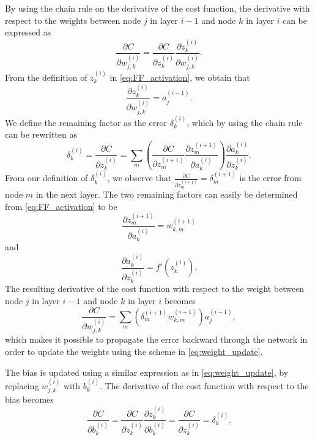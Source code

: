 \documentclass[12pt]{article}
\begin{document}
By using the chain rule on the derivative of the cost function, the derivative with respect to the weights between node $j$ in layer $i-1$ and node $k$ in layer $i$ can be expressed as
\begin{equation}
    \frac{\partial C}{\partial w^{(i)}_{j,k}} = \frac{\partial C}{\partial z^{(i)}_k} \frac{\partial z^{(i)}_k}{\partial w^{(i)}_{j, k}}.
\end{equation}
From the definition of $z^{(i)}_k$ in \autoref{eq:FF_activation}, we obtain that
\begin{equation}
    \frac{\partial z^{(i)}_k}{\partial w^{(i)}_{j, k}} = a^{(i-1)}_j.
\end{equation}
We define the remaining factor as the error $\delta_k^{(i)}$, which by using the chain rule can be rewritten as
\begin{equation}
    \delta_k^{(i)} = \frac{\partial C}{\partial z^{(i)}_k} = \sum_m \left( \frac{\partial C}{\partial z^{(i+1)}_m} \frac{\partial z^{(i+1)}_m}{\partial a^{(i)}_k} \right) \frac{\partial a^{(i)}_k}{\partial z^{(i)}_k}.
\end{equation}
From our definition of $\delta_k^{(i)}$, we observe that $\frac{\partial C}{\partial z_m^{(i+1)}} = \delta_m^{(i+1)}$ is the error from node $m$ in the next layer. The two remaining factors can easily be determined from \autoref{eq:FF_activation} to be
\begin{equation}
    \frac{\partial z^{(i+1)}_m}{\partial a^{(i)}_k} = w^{(i+1)}_{k, m}
\end{equation}
and
\begin{equation}
    \frac{\partial a^{(i)}_k}{\partial z^{(i)}_k} = f'(z^{(i)}_k).
\end{equation}
The resulting derivative of the cost function with respect to the weight between node $j$ in layer $i-1$ and node $k$ in layer $i$ becomes
\begin{equation}
    \frac{\partial C}{\partial w^{(i)}_{j,k}} = \sum_m \left(\delta^{(i+1)}_m w^{(i+1)}_{k, m} \right) a^{(i-1)}_j,
\end{equation}
which makes it possible to propagate the error backward through the network in order to update the weights using the scheme in \autoref{eq:weight_update}.

The bias is updated using a similar expression as in \autoref{eq:weight_update}, by replacing $w^{(i)}_{j,k}$ with $b^{(i)}_k$. The derivative of the cost function with respect to the bias becomes
\begin{equation}
    \frac{\partial C}{\partial b^{(i)}_k} = \frac{\partial C}{\partial z^{(i)}_k} \frac{\partial z^{(i)}_k}{\partial b^{(i)}_k} = \frac{\partial C}{\partial z^{(i)}_k} = \delta^{(i)}_k.
\end{equation}
\end{document}
